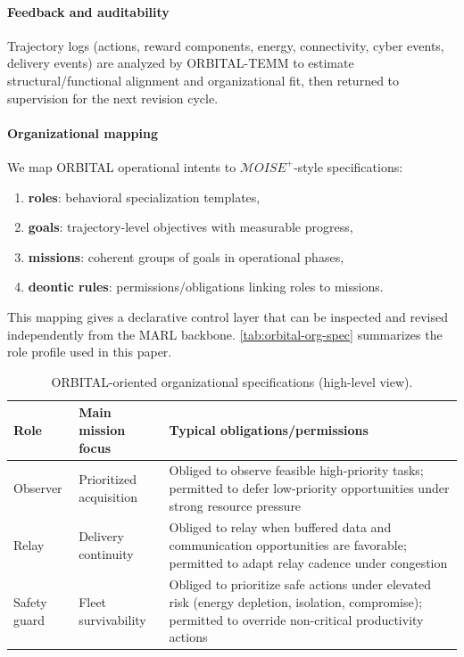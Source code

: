 \documentclass[sigconf]{aamas}
\begin{document}
\paragraph{Feedback and auditability}
Trajectory logs (actions, reward components, energy, connectivity, cyber events, delivery events) are analyzed by ORBITAL-TEMM to estimate structural/functional alignment and organizational fit, then returned to supervision for the next revision cycle.

\paragraph{Organizational mapping}
We map ORBITAL operational intents to $\mathcal{M}OISE^+$-style specifications:
\begin{enumerate}
    \item \textbf{roles}: behavioral specialization templates,
    \item \textbf{goals}: trajectory-level objectives with measurable progress,
    \item \textbf{missions}: coherent groups of goals in operational phases,
    \item \textbf{deontic rules}: permissions/obligations linking roles to missions.
\end{enumerate}
This mapping gives a declarative control layer that can be inspected and revised independently from the MARL backbone.
\autoref{tab:orbital-org-spec} summarizes the role profile used in this paper.
\begin{table}[h!]
    \caption{ORBITAL-oriented organizational specifications (high-level view).}
    \label{tab:orbital-org-spec}
    \centering
    \scriptsize
    \begin{tabularx}{\columnwidth}{p{1.8cm} p{2.5cm} X}
        \toprule
        Role         & Main mission focus      & Typical obligations/permissions                                                                                                                           \\
        \midrule
        Observer     & Prioritized acquisition & Obliged to observe feasible high-priority tasks; permitted to defer low-priority opportunities under strong resource pressure                             \\
        Relay        & Delivery continuity     & Obliged to relay when buffered data and communication opportunities are favorable; permitted to adapt relay cadence under congestion                      \\
        Safety guard & Fleet survivability     & Obliged to prioritize safe actions under elevated risk (energy depletion, isolation, compromise); permitted to override non-critical productivity actions \\
        \bottomrule
    \end{tabularx}
\end{table}
\end{document}
